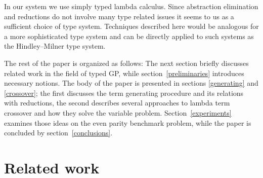 \documentclass{sig-alternate}
\newcommand{\red}[1]{{\color{red} #1}}
\newcommand{\nehodi}[1]{{\color{yellow} #1}}
\begin{document}
In our system we use simply typed lambda calculus. Since abstraction elimination and reductions do not involve many type related issues it seems to us as a sufficient choice of type system. Techniques described here would be analogous for a more sophisticated type system and can be directly applied to such systems as the Hindley–Milner type system.




The rest of the paper is organized as follows: The next section briefly discusses related work in the field of typed GP, while section~\ref{preliminaries} introduces necessary notions.
The body of the paper is presented in sections \ref{generating} and \ref{crossover}; the first discusses the term generating 
procedure and its relations
with reductions, the second describes several approaches to lambda term
crossover and how they solve the variable problem. Section~\ref{experiments} examines those ideas on the even parity benchmark problem, while the paper is concluded by section~\ref{conclusions}.

\section{Related work}
\label{related}
\end{document}
